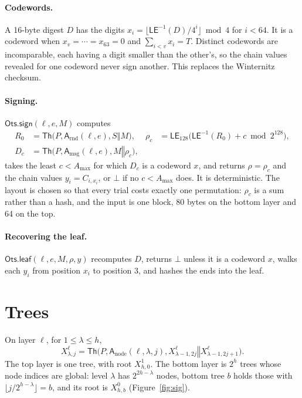 \documentclass[11pt]{article}
\newcommand{\Th}{\mathsf{Th}}
\newcommand{\OtsSign}{\mathsf{Ots.sign}}
\newcommand{\OtsLeaf}{\mathsf{Ots.leaf}}
\newcommand{\LE}{\mathsf{LE}}
\newcommand{\concat}{\mathbin\Vert}
\newcommand{\addr}{\mathsf{A}}
\newcommand{\amax}{A_{\max}}
\begin{document}
\paragraph{Codewords.} A 16-byte digest $D$ has the digits $x_i=\lfloor\LE^{-1}(D)/4^i\rfloor\bmod4$ for $i<64$. It is a codeword when $x_v=\cdots=x_{63}=0$ and $\sum_{i<v}x_i=T$. Distinct codewords are incomparable, each having a digit smaller than the other's, so the chain values revealed for one codeword never sign another. This replaces the Winternitz checksum.

\paragraph{Signing.} $\OtsSign(\ell,e,M)$ computes
\[
\begin{aligned}
  R_0&=\Th\bigl(P,\addr_{\mathrm{rnd}}(\ell,e),S\concat M\bigr),&
  \rho_c&=\LE_{128}\bigl(\LE^{-1}(R_0)+c\bmod2^{128}\bigr),\\
  D_c&=\Th\bigl(P,\addr_{\mathrm{msg}}(\ell,e),M\concat\rho_c\bigr),
\end{aligned}
\]
takes the least $c<\amax$ for which $D_c$ is a codeword $x$, and returns $\rho=\rho_c$ and the chain values $y_i=C_{i,x_i}$, or $\bot$ if no $c<\amax$ does. It is deterministic. The layout is chosen so that every trial costs exactly one permutation: $\rho_c$ is a sum rather than a hash, and the input is one block, 80 bytes on the bottom layer and 64 on the top.

\paragraph{Recovering the leaf.} $\OtsLeaf(\ell,e,M,\rho,y)$ recomputes $D$, returns $\bot$ unless it is a codeword $x$, walks each $y_i$ from position $x_i$ to position $3$, and hashes the ends into the leaf.

\section{Trees}
\label{sec:trees}

On layer $\ell$, for $1\le\lambda\le h$,
\[
  X^\ell_{\lambda,j}=\Th\bigl(P,\addr_{\mathrm{node}}(\ell,\lambda,j),X^\ell_{\lambda-1,2j}\concat X^\ell_{\lambda-1,2j+1}\bigr).
\]
The top layer is one tree, with root $X^1_{h,0}$. The bottom layer is $2^h$ trees whose node indices are global: level $\lambda$ has $2^{2h-\lambda}$ nodes, bottom tree $b$ holds those with $\lfloor j/2^{h-\lambda}\rfloor=b$, and its root is $X^0_{h,b}$ (Figure~\ref{fig:sig}).
\end{document}
